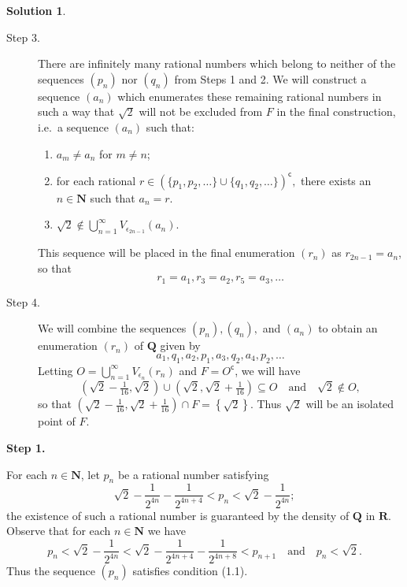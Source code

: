 \documentclass[12pt]{article}
\theoremstyle{definition}
\theoremstyle{exercise}
\theoremstyle{solution}
\newtheorem*{solution}{Solution}
\newcommand{\setcomp}[1]{#1^{\mathsf{c}}}
\newcommand{\quand}{\quad \text{and} \quad}
\newcommand{\N}{\mathbf{N}}
\newcommand{\Q}{\mathbf{Q}}
\newcommand{\R}{\mathbf{R}}
\begin{document}
\begin{solution}
\begin{enumerate}
\begin{description}
            \item[Step 3.] There are infinitely many rational numbers which belong to neither of the sequences \( (p_n) \) nor \( (q_n) \) from Steps 1 and 2. We will construct a sequence \( (a_n) \) which enumerates these remaining rational numbers in such a way that \( \sqrt{2} \) will not be excluded from \( F \) in the final construction, i.e.\ a sequence \( (a_n) \) such that:
            \begin{enumerate}[itemsep=8pt, leftmargin=44pt, label=(3.\arabic*)]
                \item \( a_m \neq a_n \) for \( m \neq n \);

                \item for each rational \( r \in \setcomp{(\{ p_1, p_2, \ldots \} \cup \{ q_1, q_2, \ldots \})}, \) there exists an \( n \in \N \) such that \( a_n = r \).

                \item \( \sqrt{2} \not\in \bigcup_{n=1}^{\infty} V_{\epsilon_{2n-1}}(a_n) \).
            \end{enumerate}
            This sequence will be placed in the final enumeration \( (r_n) \) as \( r_{2n-1} = a_n \), so that
            \[
                r_1 = a_1, r_3 = a_2, r_5 = a_3, \ldots
            \]

            \item[Step 4.] We will combine the sequences \( (p_n), (q_n), \) and \( (a_n) \) to obtain an enumeration \( (r_n) \) of \( \Q \) given by
            \[
                a_1, q_1, a_2, p_1, a_3, q_2, a_4, p_2, \ldots
            \]
            Letting \( O = \bigcup_{n=1}^{\infty} V_{\epsilon_n}(r_n) \) and \( F = \setcomp{O} \), we will have
            \[
                \left( \sqrt{2} - \tfrac{1}{16}, \sqrt{2} \right) \cup \left( \sqrt{2}, \sqrt{2} + \tfrac{1}{16} \right) \subseteq O \quand \sqrt{2} \not\in O,
            \]
            so that \( \left( \sqrt{2} - \tfrac{1}{16}, \sqrt{2} + \tfrac{1}{16} \right) \cap F = \left\{ \sqrt{2} \right\} \). Thus \( \sqrt{2} \) will be an isolated point of \( F \).
        \end{description}

        \noindent \hrulefill

        {\Large \textbf{Step 1.}}

        For each \( n \in \N \), let \( p_n \) be a rational number satisfying
        \[
            \sqrt{2} - \frac{1}{2^{4n}} - \frac{1}{2^{4n + 4}} < p_n < \sqrt{2} - \frac{1}{2^{4n}};
        \]
        the existence of such a rational number is guaranteed by the density of \( \Q \) in \( \R \). Observe that for each \( n \in \N \) we have
        \[
            p_n < \sqrt{2} - \frac{1}{2^{4n}} < \sqrt{2} - \frac{1}{2^{4n+4}} - \frac{1}{2^{4n + 8}} < p_{n+1} \quand p_n < \sqrt{2}.
        \]
        Thus the sequence \( (p_n) \) satisfies condition (1.1).
        

\end{enumerate}
\end{solution}
\end{document}
